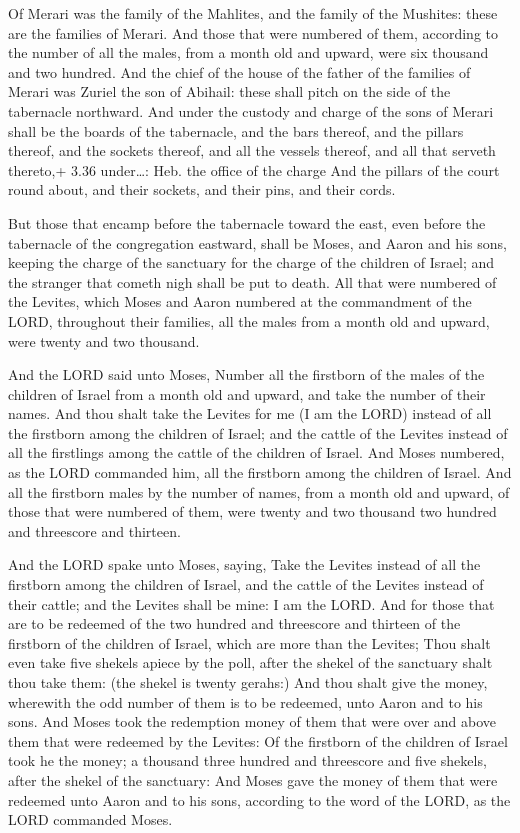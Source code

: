  Of Merari was the family of the Mahlites, and the family
of the Mushites: these are the families of Merari.  And
those that were numbered of them, according to the number of all the
males, from a month old and upward, were six thousand and two hundred.
 And the chief of the house of the father of the families
of Merari was Zuriel the son of Abihail: these shall pitch on the side
of the tabernacle northward.  And under the custody and
charge of the sons of Merari shall be the boards of the tabernacle, and
the bars thereof, and the pillars thereof, and the sockets thereof, and
all the vessels thereof, and all that serveth thereto,+ 3.36
under\ldots: Heb. the office of the charge  And the pillars
of the court round about, and their sockets, and their pins, and their
cords.

 But those that encamp before the tabernacle toward the
east, even before the tabernacle of the congregation eastward, shall be
Moses, and Aaron and his sons, keeping the charge of the sanctuary for
the charge of the children of Israel; and the stranger that cometh nigh
shall be put to death.  All that were numbered of the
Levites, which Moses and Aaron numbered at the commandment of the LORD,
throughout their families, all the males from a month old and upward,
were twenty and two thousand.

 And the LORD said unto Moses, Number all the firstborn
of the males of the children of Israel from a month old and upward, and
take the number of their names.  And thou shalt take the
Levites for me (I am the LORD) instead of all the firstborn among the
children of Israel; and the cattle of the Levites instead of all the
firstlings among the cattle of the children of Israel.  And
Moses numbered, as the LORD commanded him, all the firstborn among the
children of Israel.  And all the firstborn males by the
number of names, from a month old and upward, of those that were
numbered of them, were twenty and two thousand two hundred and
threescore and thirteen.

 And the LORD spake unto Moses, saying, 
Take the Levites instead of all the firstborn among the children of
Israel, and the cattle of the Levites instead of their cattle; and the
Levites shall be mine: I am the LORD.  And for those that
are to be redeemed of the two hundred and threescore and thirteen of the
firstborn of the children of Israel, which are more than the Levites;
 Thou shalt even take five shekels apiece by the poll,
after the shekel of the sanctuary shalt thou take them: (the shekel is
twenty gerahs:)  And thou shalt give the money, wherewith
the odd number of them is to be redeemed, unto Aaron and to his sons.
 And Moses took the redemption money of them that were over
and above them that were redeemed by the Levites:  Of the
firstborn of the children of Israel took he the money; a thousand three
hundred and threescore and five shekels, after the shekel of the
sanctuary:  And Moses gave the money of them that were
redeemed unto Aaron and to his sons, according to the word of the LORD,
as the LORD commanded Moses.

